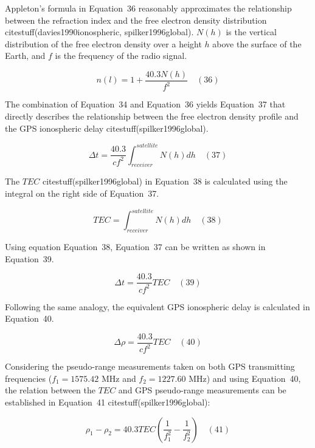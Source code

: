 \documentclass[preprint,12pt]{elsarticle}
\begin{document}
Appleton’s formula in Equation~36 reasonably approximates the relationship between the refraction index and the free electron density distribution citestuff(davies1990ionospheric, spilker1996global). $N(h)$ is the vertical distribution of the free electron density over a height $h$ above the surface of the Earth, and $f$ is the frequency of the radio signal.

\begin{equation}
	n(l) = 1 + \frac{40.3 N(h)}{f^{2}}
	\quad\left(36\right)
\end{equation}

The combination of Equation~34 and Equation~36 yields Equation~37 that directly describes the relationship between the free electron density profile and the GPS ionospheric delay citestuff(spilker1996global).

\begin{equation}
	\Delta t = \frac{40.3}{c f^{2}} \int_{receiver}^{satellite} N(h)dh
	\quad\left(37\right)
\end{equation}

The $TEC$ citestuff(spilker1996global) in Equation~38 is calculated using the integral on the right side of Equation~37.

\begin{equation}
	TEC = \int_{receiver}^{satellite} N(h)dh
	\quad\left(38\right)
\end{equation}

Using equation Equation~38, Equation~37 can be written as shown in Equation~39.

\begin{equation}
	\Delta t = \frac{40.3}{c f^{2}} TEC
	\quad\left(39\right)
\end{equation}

Following the same analogy, the equivalent GPS ionospheric delay is calculated in Equation~40.

\begin{equation}
	\Delta \rho = \frac{40.3}{c f^{2}} TEC
	\quad\left(40\right)
\end{equation}

Considering the pseudo-range measurements taken on both GPS transmitting frequencies ($f_{1}=1575.42$ MHz and $f_{2}=1227.60$ MHz) and using Equation~40, the relation between the $TEC$ and GPS pseudo-range measurements can be established in Equation~41 citestuff(spilker1996global):
 
\begin{equation}
	\rho_{1} - \rho_{2} = 40.3 TEC \left( \frac{1}{f_{1}^{2}} - \frac{1}{f_{2}^{2}} \right)
	\quad\left(41\right)
\end{equation}
\end{document}
